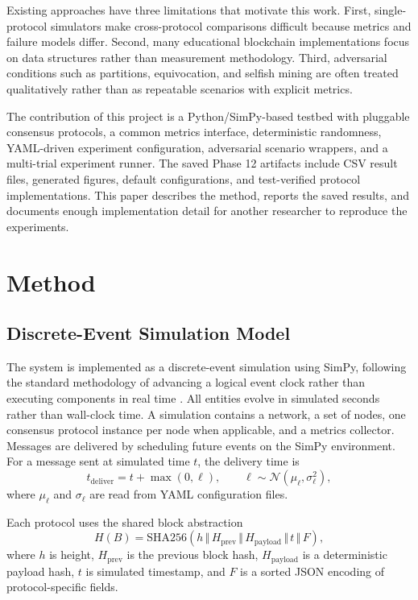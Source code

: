 \documentclass[11pt]{article}
\begin{document}
Existing approaches have three limitations that motivate this work. First, single-protocol simulators make cross-protocol comparisons difficult because metrics and failure models differ. Second, many educational blockchain implementations focus on data structures rather than measurement methodology. Third, adversarial conditions such as partitions, equivocation, and selfish mining are often treated qualitatively rather than as repeatable scenarios with explicit metrics.

The contribution of this project is a Python/SimPy-based testbed with pluggable consensus protocols, a common metrics interface, deterministic randomness, YAML-driven experiment configuration, adversarial scenario wrappers, and a multi-trial experiment runner. The saved Phase 12 artifacts include CSV result files, generated figures, default configurations, and test-verified protocol implementations. This paper describes the method, reports the saved results, and documents enough implementation detail for another researcher to reproduce the experiments.

\section{Method}

\subsection{Discrete-Event Simulation Model}

The system is implemented as a discrete-event simulation using SimPy, following the standard methodology of advancing a logical event clock rather than executing components in real time \cite{law2007simulation}. All entities evolve in simulated seconds rather than wall-clock time. A simulation contains a network, a set of nodes, one consensus protocol instance per node when applicable, and a metrics collector. Messages are delivered by scheduling future events on the SimPy environment. For a message sent at simulated time $t$, the delivery time is
\begin{equation}
  t_{\mathrm{deliver}} = t + \max(0, \ell), \qquad
  \ell \sim \mathcal{N}(\mu_{\ell}, \sigma_{\ell}^{2}),
\end{equation}
where $\mu_{\ell}$ and $\sigma_{\ell}$ are read from YAML configuration files.

Each protocol uses the shared block abstraction
\begin{equation}
  H(B) = \mathrm{SHA256}(h \,\Vert\, H_{\mathrm{prev}} \,\Vert\, H_{\mathrm{payload}}
  \,\Vert\, t \,\Vert\, F),
\end{equation}
where $h$ is height, $H_{\mathrm{prev}}$ is the previous block hash, $H_{\mathrm{payload}}$ is a deterministic payload hash, $t$ is simulated timestamp, and $F$ is a sorted JSON encoding of protocol-specific fields.
\end{document}
